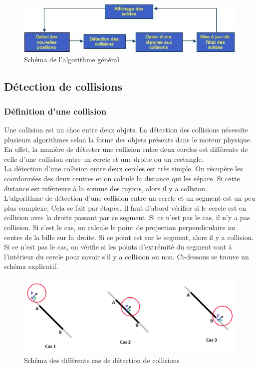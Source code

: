 \documentclass{report}
\begin{document}
\begin{figure}[H]
\centering
\includegraphics[scale=1.0]{algo_general.PNG}
\caption{Schéma de l'algorithme général \cite{03}}
\end{figure}

\subsection{Détection de collisions}

\subsubsection{Définition d'une collision}

Une collision est un choc entre deux objets. La détection des collisions nécessite plusieurs algorithmes selon la forme des objets présents dans le moteur physique. En effet, la manière de détecter une collision entre deux cercles est différente de celle d’une collision entre un cercle et une droite ou un rectangle. \\

La détection d’une collision entre deux cercles est très simple. On récupère les coordonnées des deux centres et on calcule la distance qui les sépare. Si cette distance est inférieure à la somme des rayons, alors il y a collision. \\

\newpage
L’algorithme de détection d’une collision entre un cercle et un segment est un peu plus complexe. Cela se fait par étapes. Il faut d’abord vérifier si le cercle est en collision avec la droite passant par ce segment. Si ce n’est pas le cas, il n’y a pas collision. Si c’est le cas, on calcule le point de projection perpendiculaire au centre de la bille sur la droite. Si ce point est sur le segment, alors il y a collision. Si ce n’est pas le cas, on vérifie si les points d’extrémité du segment sont à l’intérieur du cercle pour savoir s’il y a collision ou non. Ci-dessous se trouve un schéma explicatif.

\begin{figure}[H]
\centering
\includegraphics[scale=1.0]{detect_collision.PNG}
\caption{Schéma des différents cas de détection de collisions}
\end{figure}
\end{document}
